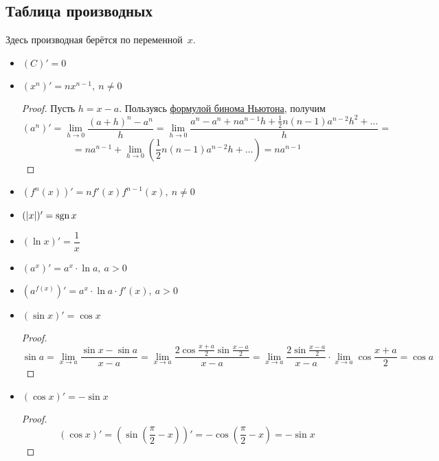 \subsection{Таблица производных}
Здесь производная берётся по переменной~$x$.
\begin{itemize}
	\item $(C)' = 0$
	
	\item $(x^n)' = nx^{n-1}, \ n \neq 0$
	\begin{proof}
	Пусть $h = x - a$.
	Пользуясь \hyperref[eq:binomial_expansion]{формулой бинома Ньютона}, получим
	\begin{equation*}
	(a^n)' =
	\lim_{h \to 0} \frac{(a + h)^n - a^n}h =
	\lim_{h \to 0} \frac{a^n - a^n + n a^{n-1} h + \frac12 n(n - 1) a^{n-2} h^2 + \ldots}h =
	\end{equation*}
	\begin{equation*}
	= n a^{n-1} + \lim_{h \to 0} \left( \frac12 n(n - 1) a^{n-2} h + \ldots \right) =
	n a^{n-1}
	\end{equation*}
	\end{proof}
	
	\item $(f^n(x))' = nf'(x)f^{n-1}(x), \ n \neq 0$
	
	\item $(|x|)' = \operatorname{sgn} x$
		
	\item $(\ln x)' = \dfrac1x$
	
	\item $(a^x)' = a^x \cdot \ln a, \ a > 0$
	
	\item $(a^{f(x)})' = a^x \cdot \ln a \cdot f'(x), \ a > 0$
	
	\item $(\sin x)' = \cos x$
	\begin{proof}
	\begin{equation*}
	\sin a =
	\lim_{x \to a} \frac{\sin x - \sin a}{x - a} =
	\lim_{x \to a} \frac{2 \cos \frac{x + a}2 \sin \frac{x - a}2}{x - a} =
	\lim_{x \to a} \frac{2 \sin \frac{x - a}2}{x - a} \cdot \lim_{x \to a} \cos \frac{x + a}2 =
	\cos a
	\end{equation*}
	\end{proof}
	
	\item $(\cos x)' = -\sin x$
	\begin{proof}
	\begin{equation*}
	(\cos x)' =
	(\sin \left( \frac\pi{2} - x \right))' =
	-\cos \left( \frac\pi{2} - x \right) =
	-\sin x
	\end{equation*}
	\end{proof}
	

\end{itemize}
